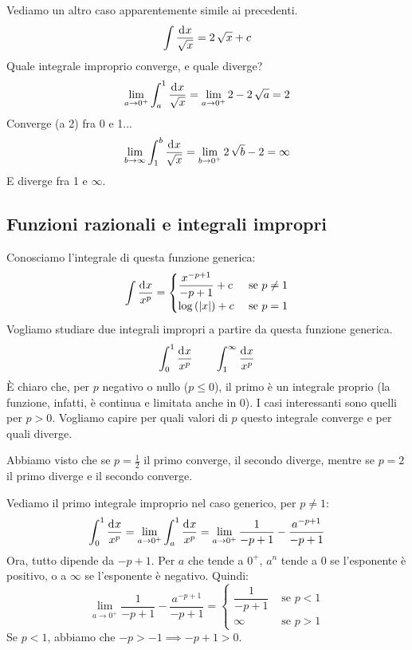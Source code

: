\begin{exmp}
Vediamo un altro caso apparentemente simile ai precedenti. 
\[
\int \frac{\diff x}{\sqrt{x}} = 2 \, \sqrt{x} + c
\]
Quale integrale improprio converge, e quale diverge?
\[
\lim_{a \to 0^+} \int_{a}^{1} \frac{\diff x}{\sqrt{x}} =
\lim_{a \to 0^+} 2 - 2 \, \sqrt{a} = 2
\]
Converge (a 2) fra 0 e 1...
\[
\lim_{b \to \infty} \int_{1}^{b} \frac{\diff x}{\sqrt{x}} =
\lim_{b \to 0^+} 2 \, \sqrt{b} - 2 = \infty
\]
E diverge fra 1 e $\infty$.
\end{exmp}

\subsection{Funzioni razionali e integrali impropri}
\label{integrali_impropri_razionali}

Conosciamo l'integrale di questa funzione generica:
\[
\int \frac{\diff x}{x^p} = 
\begin{cases}
\dfrac{x^{-p + 1}}{- p + 1} + c & \text{ se } p \neq 1 \\
\abslog{x} + c & \text{ se } p = 1
\end{cases}
\]
Vogliamo studiare due integrali impropri a partire da questa funzione generica.
\begin{align*}
\int_{0}^{1} \frac{\diff x}{x^p} \qquad
\int_{1}^{\infty} \frac{\diff x}{x^p}
\end{align*}
\`E chiaro che, per $p$ negativo o nullo ($p \le 0$), il primo \`e un integrale proprio (la funzione, infatti, \`e continua e limitata anche in 0). I casi interessanti sono quelli per $p > 0$. Vogliamo capire per quali valori di $p$ questo integrale converge e per quali diverge.

Abbiamo visto che se $p = \frac{1}{2}$ il primo converge, il secondo diverge, mentre se $p = 2$ il primo diverge e il secondo converge.

Vediamo il primo integrale improprio nel caso generico, per $p \neq 1$:
\[
\int_{0}^{1} \frac{\diff x}{x^p} = 
\lim_{a \to 0^+} \int_{a}^{1} \frac{\diff x}{x^p} =
\lim_{a \to 0^+} \frac{1}{- p + 1} - \frac{a^{-p + 1}}{-p + 1}
\]
Ora, tutto dipende da $-p + 1$. Per $a$ che tende a $0^+$, $a^n$ tende a $0$ se l'esponente \`e positivo, o a $\infty$ se l'esponente \`e negativo. Quindi:
\[
\lim_{a \to 0^+} \frac{1}{- p + 1} - \frac{a^{-p + 1}}{-p + 1} =
\begin{cases}
\dfrac{1}{- p + 1} & \text{ se } p < 1 \\
\infty & \text{ se } p > 1
\end{cases}
\]
Se $p < 1$, abbiamo che $-p > - 1 \implies - p + 1 > 0$.

